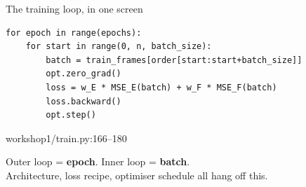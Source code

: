 \documentclass[aspectratio=169,11pt]{beamer}
\newcommand{\srcref}[1]{{\color{muted}\ttfamily\footnotesize #1}}
\begin{document}
\begin{frame}[fragile]{The training loop, in one screen}
\begin{lstlisting}
for epoch in range(epochs):
    for start in range(0, n, batch_size):
        batch = train_frames[order[start:start+batch_size]]
        opt.zero_grad()
        loss = w_E * MSE_E(batch) + w_F * MSE_F(batch)
        loss.backward()
        opt.step()
\end{lstlisting}
  \vspace{0.4em}
  \srcref{workshop1/train.py:166--180}

  \vspace{0.8em}
  Outer loop = \textbf{epoch}. Inner loop = \textbf{batch}. \\
  Architecture, loss recipe, optimiser schedule all hang off this.
\end{frame}
\end{document}
